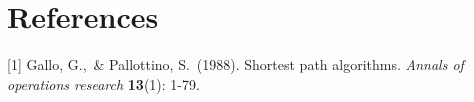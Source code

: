 \documentclass{article}
\begin{document}
\begin{comment}
A number of width problems arise when \LaTeX{} cannot properly hyphenate a
line. Please give LaTeX hyphenation hints using the \verb+\-+ command when
necessary.


\section*{Broader Impact}

Authors are required to include a statement of the broader impact of their work, including its ethical aspects and future societal consequences. 
Authors should discuss both positive and negative outcomes, if any. For instance, authors should discuss a) 
who may benefit from this research, b) who may be put at disadvantage from this research, c) what are the consequences of failure of the system, and d) whether the task/method leverages
biases in the data. If authors believe this is not applicable to them, authors can simply state this.

Use unnumbered first level headings for this section, which should go at the end of the paper. {\bf Note that this section does not count towards the eight pages of content that are allowed.}

\begin{ack}
Use unnumbered first level headings for the acknowledgments. All acknowledgments
go at the end of the paper before the list of references. Moreover, you are required to declare 
funding (financial activities supporting the submitted work) and competing interests (related financial activities outside the submitted work). 
More information about this disclosure can be found at: \url{https://neurips.cc/Conferences/2020/PaperInformation/FundingDisclosure}.


Do {\bf not} include this section in the anonymized submission, only in the final paper. You can use the \texttt{ack} environment provided in the style file to autmoatically hide this section in the anonymized submission.
\end{ack}

\end{comment} 

\section*{References}
\small

[1] Gallo, G.,\ \& Pallottino, S.\ (1988). Shortest path algorithms. {\it Annals 
  of operations research} {\bf 13}(1): 1-79.
\end{document}
